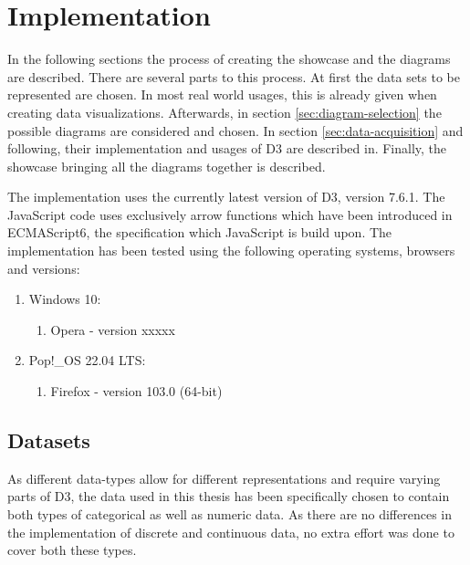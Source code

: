 \chapter{Implementation}


In the following sections the process of creating the showcase and the diagrams are described. There are several parts to this process. At first the data sets to be represented are chosen. In most real world usages, this is already given when creating data visualizations. Afterwards, in section \ref{sec:diagram-selection} the possible diagrams are considered and chosen. In section \ref{sec:data-acquisition} and following, their implementation and usages of D3 are described in. Finally, the showcase bringing all the diagrams together is described.

The implementation uses the currently latest version of D3, version 7.6.1. The JavaScript code uses exclusively arrow functions which have been introduced in ECMAScript6, the specification which JavaScript is build upon\cite{ecmascript}. The implementation has been tested using the following operating systems, browsers and versions:
\begin{enumerate}
    \item Windows 10:
    \begin{enumerate}
        \item Opera - version xxxxx
    \end{enumerate}
    \item Pop!\_OS 22.04 LTS:
    \begin{enumerate}
        \item Firefox - version 103.0 (64-bit)
    \end{enumerate}
\end{enumerate}

\section{Datasets}
As different data-types allow for different representations and require varying parts of D3, the data used in this thesis has been specifically chosen to contain both types of categorical as well as numeric data. As there are no differences in the implementation of discrete and continuous data, no extra effort was done to cover both these types.

